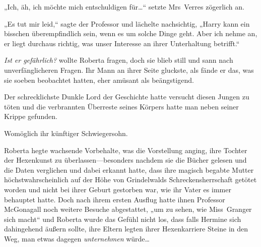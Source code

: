 „Ich, äh, ich möchte mich entschuldigen für…“ setzte Mrs~Verres zögerlich an.

„Es tut mir leid,“ sagte der Professor und lächelte nachsichtig, „Harry kann ein bisschen überempfindlich sein, wenn es um solche Dinge geht. Aber ich nehme an, er liegt durchaus richtig, was unser Interesse an ihrer Unterhaltung betrifft.“

\emph{Ist er gefährlich?} wollte Roberta fragen, doch sie blieb still und sann nach unverfänglicheren Fragen. Ihr Mann an ihrer Seite gluckste, als fände er das, was sie soeben beobachtet hatten, eher amüsant als beängstigend.

Der schrecklichste Dunkle Lord der Geschichte hatte versucht diesen Jungen zu töten und die verbrannten Überreste seines Körpers hatte man neben seiner Krippe gefunden.

Womöglich ihr künftiger Schwiegersohn.

Roberta hegte wachsende Vorbehalte, was die Vorstellung anging, ihre Tochter der Hexenkunst zu überlassen—besonders nachdem sie die Bücher gelesen und die Daten verglichen und dabei erkannt hatte, dass ihre magisch begabte Mutter höchstwahrscheinlich auf der Höhe von Grindelwalds Schreckensherrschaft getötet worden und nicht bei ihrer Geburt gestorben war, wie ihr Vater es immer behauptet hatte. Doch nach ihrem ersten Ausflug hatte ihnen Professor McGonagall noch weitere Besuche abgestattet, „um zu sehen, wie Miss~Granger sich macht“ und Roberta wurde das Gefühl nicht los, dass falls Hermine sich dahingehend äußern sollte, ihre Eltern legten ihrer Hexenkarriere Steine in den Weg, man etwas dagegen \emph{unternehmen} würde…

